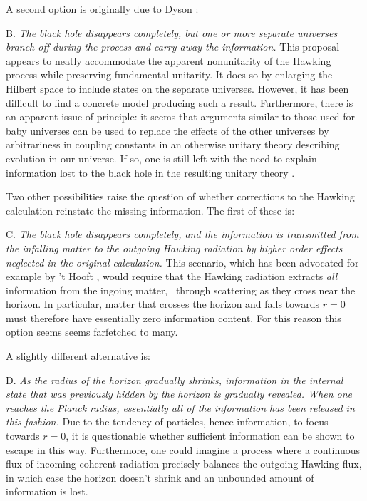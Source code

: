 A second option is originally due to Dyson :
\itemskip
\item{B.} {\it The black hole disappears completely, but one or more
separate universes branch off during the process and carry away the
information. }
\itemskip
This proposal appears to neatly accommodate the apparent nonunitarity of the
Hawking process while preserving fundamental unitarity.  It does so by
enlarging
the Hilbert space to include states on the separate universes.  However, it
has been difficult to find a concrete model producing such a result.
Furthermore, there is an apparent issue of principle:  it seems that arguments
similar to those used for baby universes  can
be used to replace the effects of the other universes by
arbitrariness in coupling constants in an otherwise unitary theory
describing evolution in
our universe.  If so,
one is still left with the need to explain
information lost to the black hole in the resulting unitary
theory .

Two other possibilities raise the question of whether corrections to
the Hawking calculation reinstate the missing information.  The first
of these is:
\medskip
\noindent
\item{C.}  {\it The black hole disappears completely, and the information
is transmitted from the infalling matter to the outgoing Hawking
radiation by higher order effects neglected in the original
calculation.  }
\medskip
\noindent
This scenario, which has been advocated for example by 't Hooft ,
would require that the Hawking radiation
extracts {\it all} information from the ingoing matter, \eg\ through scattering
as they cross near the horizon.  In particular, matter that crosses the
horizon and falls towards $r=0$ must therefore have essentially zero
information
content.  For this reason this option seems
seems farfetched to many.

A slightly different alternative  is:

\itemskip
\item{D.}  {\it As the radius of the horizon gradually shrinks,
information in the internal state that was previously hidden by the
horizon is gradually revealed.  When one reaches the Planck radius,
essentially all of the information has been released in this
fashion.}
\itemskip
Due to the tendency of particles, hence information, to focus towards
$r=0$, it is questionable whether sufficient information can be shown
to escape in this way.  Furthermore, one could imagine a process where a
continuous flux of incoming coherent radiation precisely balances the outgoing
Hawking flux, in which case the horizon doesn't shrink and an unbounded
amount of information is lost.

